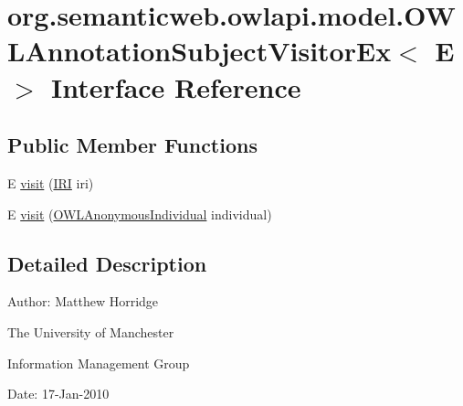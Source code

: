 \hypertarget{interfaceorg_1_1semanticweb_1_1owlapi_1_1model_1_1_o_w_l_annotation_subject_visitor_ex_3_01_e_01_4}{\section{org.\-semanticweb.\-owlapi.\-model.\-O\-W\-L\-Annotation\-Subject\-Visitor\-Ex$<$ E $>$ Interface Reference}
\label{interfaceorg_1_1semanticweb_1_1owlapi_1_1model_1_1_o_w_l_annotation_subject_visitor_ex_3_01_e_01_4}
}
\subsection*{Public Member Functions}
\begin{DoxyCompactItemize}
\item 
E \hyperlink{interfaceorg_1_1semanticweb_1_1owlapi_1_1model_1_1_o_w_l_annotation_subject_visitor_ex_3_01_e_01_4_a114608cb0f9db9e2a53415573e542de4}{visit} (\hyperlink{classorg_1_1semanticweb_1_1owlapi_1_1model_1_1_i_r_i}{I\-R\-I} iri)
\item 
E \hyperlink{interfaceorg_1_1semanticweb_1_1owlapi_1_1model_1_1_o_w_l_annotation_subject_visitor_ex_3_01_e_01_4_abb665a3eea1ce31efabf39cf734fd174}{visit} (\hyperlink{interfaceorg_1_1semanticweb_1_1owlapi_1_1model_1_1_o_w_l_anonymous_individual}{O\-W\-L\-Anonymous\-Individual} individual)
\end{DoxyCompactItemize}


\subsection{Detailed Description}
Author\-: Matthew Horridge\par
 The University of Manchester\par
 Information Management Group\par
 Date\-: 17-\/\-Jan-\/2010 

